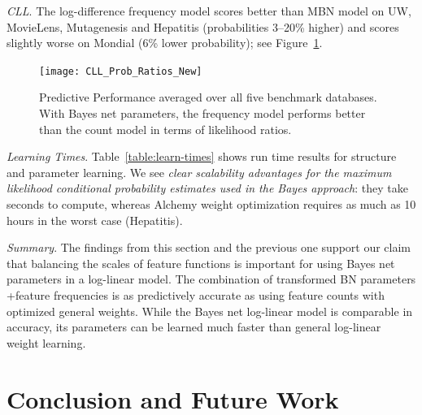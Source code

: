 \documentclass[runningheads,a4paper]{llncs}
\newcommand{\fixneeded}[1]{\textbf{[\footnotesize #1]}}
\newcommand{\point}[1]{\noindent\emph{#1}.}
\newcommand{\keypoint}[1]{{\em #1}}
\begin{document}
\point{CLL}
The log-difference frequency  model scores better than MBN model on UW, MovieLens, Mutagenesis and Hepatitis (probabilities 3--20\% higher) and scores slightly worse on Mondial (6\% lower probability); see Figure~\ref{fig:summarize}.

\begin{figure}[htbp]

\begin{center}
\texttt{[image: CLL\_Prob\_Ratios\_New]}
\caption{Predictive Performance averaged over all five benchmark databases. With Bayes net parameters, the frequency model performs better than the count model in terms of likelihood ratios. 
}
\label{fig:summarize}
\end{center}
\end{figure}

\point{Learning Times}
Table~\ref{table:learn-times} shows run time results for structure and parameter learning. We see \keypoint{clear scalability advantages for the maximum likelihood conditional probability estimates used in the Bayes approach}: they take seconds to compute, whereas Alchemy weight optimization requires as much as 10 hours in the worst case (Hepatitis). 



\point{Summary} 
The findings from this section and the previous one support our claim that balancing the scales of feature functions is important for using Bayes net parameters in a log-linear model. The combination of  transformed BN parameters +feature frequencies  is as predictively accurate as using feature counts with optimized general weights.
While the Bayes net log-linear model is comparable in accuracy, its parameters can be learned much faster than general log-linear weight learning.
%

 
 





 

\section{Conclusion and Future Work} 
\label{sec:conclusion}
\end{document}
